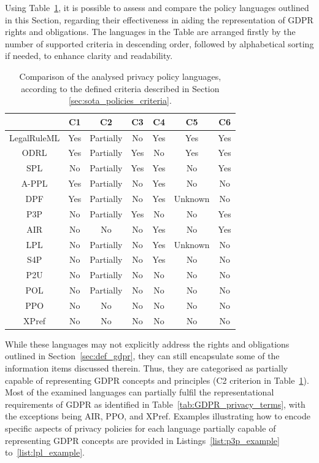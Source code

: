 Using Table~\ref{tab:languagesComparison}, it is possible to assess and compare the policy languages outlined in this Section, regarding their effectiveness in aiding the representation of GDPR rights and obligations. 
The languages in the Table are arranged firstly by the number of supported criteria in descending order, followed by alphabetical sorting if needed, to enhance clarity and readability.

\begin{table}[ht]
\centering
\caption[Comparison of the analysed privacy policy languages.]{Comparison of the analysed privacy policy languages, according to the defined criteria described in Section \ref{sec:sota_policies_criteria}.}
\label{tab:languagesComparison} 
\begin{tabular}{ c||c|c|c|c|c|c}
 & C1 & C2 & C3 & C4 & C5 & C6 \\
 \hline\hline
 LegalRuleML & Yes & Partially & No & Yes & Yes & Yes \\
 \hline
 ODRL & Yes & Partially & Yes & No & Yes & Yes \\
  \hline
 SPL & No & Partially & Yes & Yes & No & Yes \\
 \hline
  A-PPL & Yes & Partially & No & Yes & No & No \\
 \hline
  DPF & Yes & Partially & No & Yes & Unknown & No \\
 \hline
  P3P & No & Partially & Yes & No & No & Yes \\
 \hline
  AIR & No & No & No & Yes & No & Yes \\
 \hline
  LPL & No & Partially & No & Yes & Unknown & No \\
  \hline
 S4P & No & Partially & No & Yes & No & No \\
 \hline
  P2U & No & Partially & No & No & No & No \\
 \hline
 POL & No & Partially & No & No & No & No \\
 \hline
  PPO & No & No & No & No & No & No \\
  \hline
 XPref & No & No & No & No & No & No \\
\end{tabular}
\end{table}

While these languages may not explicitly address the rights and obligations outlined in Section~\ref{sec:def_gdpr}, they can still encapsulate some of the information items discussed therein.
Thus, they are categorised as partially capable of representing GDPR concepts and principles (C2 criterion in Table~\ref{tab:languagesComparison}).
Most of the examined languages can partially fulfil the representational requirements of GDPR as identified in Table~\ref{tab:GDPR_privacy_terms}, with the exceptions being AIR, PPO, and XPref.
Examples illustrating how to encode specific aspects of privacy policies for each language partially capable of representing GDPR concepts are provided in Listings~\ref{list:p3p_example} to~\ref{list:lpl_example}.

